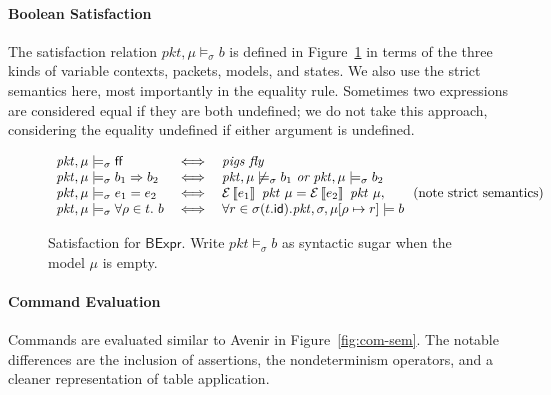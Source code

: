 \documentclass{article}
\newcommand{\pkt}{\mathit{pkt}}
\newcommand{\denote}[1]{\left\llbracket#1\right\rrbracket}
\newcommand{\edenote}[1]{\mathcal{E}\denote{#1}}
\newcommand{\FALSE}{\mathsf{ff}}
\newcommand{\BExpr}{\mathsf{BExpr}}
\newcommand{\id}{\mathsf{id}}
\begin{document}
\paragraph{Boolean Satisfaction}
The satisfaction relation $\pkt,\mu \models_\sigma b$ is defined in
Figure~\ref{fig:bool-satis} in terms of the three kinds of variable contexts,
packets, models, and states. We also use the strict semantics here, most
importantly in the equality rule. Sometimes two expressions are considered equal
if they are both undefined; we do not take this approach, considering the
equality undefined if either argument is undefined.

\begin{figure}
  \[\begin{array}{l>{\iff}cl}
  \pkt,\mu \models_\sigma \FALSE && \textit{pigs fly} \\
  \pkt,\mu \models_\sigma b_1 \Rightarrow b_2 &&
  \pkt,\mu \not\models_\sigma b_1~\textit{or}~
  \pkt,\mu \models_\sigma b_2\\
  \pkt,\mu \models_\sigma e_1 = e_2 &&
  \edenote{e_1}~\pkt~\mu = \edenote{e_2}~\pkt~\mu, \qquad
  \text{(note strict semantics)} \\
  \pkt,\mu \models_\sigma \forall \rho \in t. ~b &&
  \forall r \in \sigma(t.\id).
  \pkt,\sigma,\mu[\rho \mapsto r] \models b
  \end{array}
  \]
  \caption{Satisfaction for $\BExpr$. Write $\pkt \models_\sigma b$ as syntactic
    sugar when the model $\mu$ is empty.}
  \label{fig:bool-satis}
\end{figure}

\paragraph{Command Evaluation}
Commands are evaluated similar to Avenir in Figure~\ref{fig:com-sem}. The
notable differences are the inclusion of assertions, the nondeterminism
operators, and a cleaner representation of table application.
\end{document}
